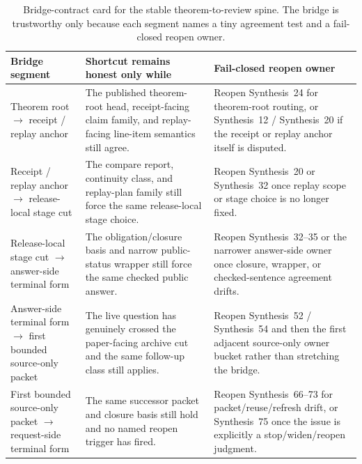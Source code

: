 \documentclass[11pt]{article}
\begin{document}
\begin{table}[t]
\centering
\small
\begin{tabularx}{\linewidth}{@{}l X X@{}}
\toprule
Bridge segment & Shortcut remains honest only while & Fail-closed reopen owner \\
\midrule
Theorem root $\to$ receipt / replay anchor & The published theorem-root head, receipt-facing claim family, and replay-facing line-item semantics still agree. & Reopen Synthesis~24 for theorem-root routing, or Synthesis~12 / Synthesis~20 if the receipt or replay anchor itself is disputed. \\
Receipt / replay anchor $\to$ release-local stage cut & The compare report, continuity class, and replay-plan family still force the same release-local stage choice. & Reopen Synthesis~20 or Synthesis~32 once replay scope or stage choice is no longer fixed. \\
Release-local stage cut $\to$ answer-side terminal form & The obligation/closure basis and narrow public-status wrapper still force the same checked public answer. & Reopen Synthesis~32--35 or the narrower answer-side owner once closure, wrapper, or checked-sentence agreement drifts. \\
Answer-side terminal form $\to$ first bounded source-only packet & The live question has genuinely crossed the paper-facing archive cut and the same follow-up class still applies. & Reopen Synthesis~52 / Synthesis~54 and then the first adjacent source-only owner bucket rather than stretching the bridge. \\
First bounded source-only packet $\to$ request-side terminal form & The same successor packet and closure basis still hold and no named reopen trigger has fired. & Reopen Synthesis~66--73 for packet/reuse/refresh drift, or Synthesis~75 once the issue is explicitly a stop/widen/reopen judgment. \\
\bottomrule
\end{tabularx}
\caption{Bridge-contract card for the stable theorem-to-review spine. The bridge is trustworthy only because each segment names a tiny agreement test and a fail-closed reopen owner.}
\label{tab:seriesspine-bridge-contract}
\end{table}
\end{document}
